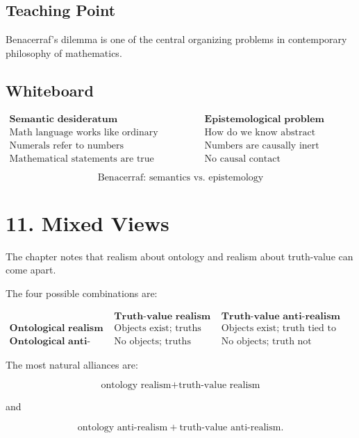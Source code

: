 \documentclass[11pt]{article}
\begin{document}
\subsection*{Teaching Point}

Benacerraf's dilemma is one of the central organizing problems in contemporary
philosophy of mathematics.

\subsection*{Whiteboard}

\[
\begin{array}{c|c}
\textbf{Semantic desideratum} & \textbf{Epistemological problem} \\
\hline
\text{Math language works like ordinary language} &
\text{How do we know abstract objects?} \\
\text{Numerals refer to numbers} &
\text{Numbers are causally inert} \\
\text{Mathematical statements are true} &
\text{No causal contact}
\end{array}
\]

\[
\boxed{\text{Benacerraf: semantics vs. epistemology}}
\]

\section*{11. Mixed Views}

The chapter notes that realism about ontology and realism about truth-value can come
apart.

The four possible combinations are:

\[
\begin{array}{c|c|c}
& \textbf{Truth-value realism} & \textbf{Truth-value anti-realism} \\
\hline
\textbf{Ontological realism} &
\text{Objects exist; truths objective} &
\text{Objects exist; truth tied to knowability} \\
\hline
\textbf{Ontological anti-realism} &
\text{No objects; truths objective} &
\text{No objects; truth not objective}
\end{array}
\]

The most natural alliances are:

\[
\text{ontology realism} + \text{truth-value realism}
\]

and

\[
\text{ontology anti-realism} + \text{truth-value anti-realism}.
\]
\end{document}
